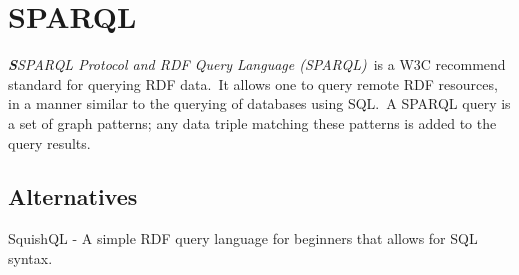 \documentclass[DIV=calc, paper=a4, fontsize=12pt, onecolumn]{scrartcl}	 %
\newcommand{\initial}[1]{ %
\lettrine[lines=3,lhang=0.3,nindent=0em,slope=0em]{
\color{DarkBlue}
{\textbf{\textit{#1}}}}{}}
\begin{document}

  \section[SPARQL Protocol and RDF Query Language (SPARQL)]{SPARQL}
  \label{sec:sparql}

  \initial{S}\textit{SPARQL Protocol and RDF Query Language (SPARQL)}\
  is a W3C recommend standard for querying RDF data.\
  It allows one to query remote RDF resources, in a manner similar to the querying of databases using SQL.\
  A SPARQL query is a set of graph patterns; any data triple matching these patterns is added to the query results. \citep{Jarrar_mashql:_2008}\\     
		
  \subsection{Alternatives}

  SquishQL - A simple RDF query language for beginners that allows for SQL syntax. \citep{_Mikhalenko_2013}\
\end{document}
